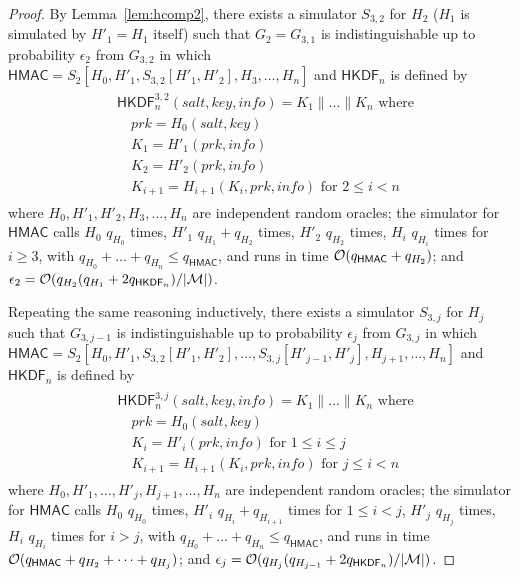 \documentclass[compsoc, conference, letterpaper, 10pt, times]{IEEEtran}
\newcommand{\HKDF}{\mathsf{HKDF}}
\newcommand{\salt}{\mathit{salt}}
\newcommand{\key}{\mathit{key}}
\newcommand{\info}{\mathit{info}}
\newcommand{\prk}{\mathit{prk}}
\newcommand{\hmac}{\mathsf{HMAC}}
\newcommand{\Smac}{\mathcal{M}}
\newcommand{\ab}{\allowbreak}
\begin{document}
\begin{proof}
By Lemma~\ref{lem:hcomp2}, there exists a simulator $S_{3,2}$ for $H_2$
($H_1$ is simulated by $H'_1 = H_1$ itself)
such that $G_2 = G_{3,1}$ is
indistinguishable up to probability $\epsilon_2$ from $G_{3,2}$ in which
$\hmac = S_2[H_0, \ab H'_1, \ab S_{3,2}[H'_1, H'_2], \ab H_3, \ab \ldots, \ab H_n]$ and $\HKDF_n$ is defined by
\begin{align*}
\begin{split}
&\HKDF^{3,2}_n(\salt,\key,\info) = K_1 \| \dots \| K_n \text{ where}\\
&\quad \prk = H_0(\salt,\key)\\
&\quad K_1 = H'_1(\prk, \info )\\
&\quad K_2 = H'_2(\prk, \info )\\
&\quad K_{i+1} = H_{i+1}(K_i, \prk, \info) \text{ for }2 \leq i < n
\end{split}
\end{align*}
where $H_0, H'_1, H'_2, H_3, \dots, H_n$ are independent random oracles;
the simulator for $\hmac$ calls 
$H_0$ $q_{H_0}$ times,
$H'_1$ $q_{H_1} + q_{H_2}$ times,
$H'_2$ $q_{H_2}$ times, $H_i$ $q_{H_i}$ times for $i \geq 3$, with
$q_{H_0} + \dots + q_{H_n} \leq q_{\hmac}$, and runs in time 
${\cal O}(q_{\hmac} + q_{H_2})$; and
$\epsilon_2 = {\cal O}(q_{H_2}(q_{H_1} + 2 q_{\HKDF_n})/|\Smac|)$.

Repeating the same reasoning inductively, there exists a simulator $S_{3,j}$ 
for $H_j$ such that $G_{3,j-1}$ is
indistinguishable up to probability $\epsilon_{j}$ from $G_{3,j}$ in which
$\hmac = S_2[H_0, \ab H'_1, \ab S_{3,2}[H'_1, H'_2], \ab \dots, \ab S_{3,j}[H'_{j-1}, H'_{j}], \ab H_{j+1}, \ab \ldots, \ab H_n]$ and $\HKDF_n$ is defined by
\begin{align*}
\begin{split}
&\HKDF^{3,j}_n(\salt,\key,\info) = K_1 \| \dots \| K_n \text{ where}\\
&\quad \prk = H_0(\salt,\key)\\
&\quad K_i = H'_i(\prk, \info )\text{ for }1 \leq i \leq j\\
&\quad K_{i+1} = H_{i+1}(K_i, \prk, \info) \text{ for }j \leq i < n
\end{split}
\end{align*}
where $H_0, H'_1, \dots, H'_{j}, H_{j+1}, \dots, H_n$ are independent random oracles;
the simulator for $\hmac$ calls 
$H_0$ $q_{H_0}$ times,
$H'_i$ $q_{H_i} + q_{H_{i+1}}$ times for $1 \leq i < j$,
$H'_{j}$ $q_{H_{j}}$ times, $H_i$ $q_{H_i}$ times for $i > j$, with
$q_{H_0} + \dots + q_{H_n} \leq q_{\hmac}$, and runs in time 
${\cal O}(q_{\hmac} + q_{H_2} + \dots + q_{H_{j}})$; and
$\epsilon_{j} = {\cal O}(q_{H_{j}}(q_{H_{j-1}} + 2 q_{\HKDF_n})/|\Smac|)$.


\end{proof}
\end{document}
